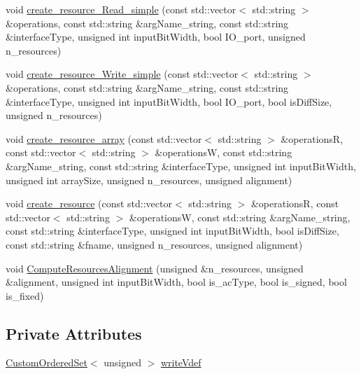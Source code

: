 \begin{DoxyCompactItemize}
\item 
void \hyperlink{classinterface__infer_a1b660bd8340d00695b5b8163edabe9f2}{create\+\_\+resource\+\_\+\+Read\+\_\+simple} (const std\+::vector$<$ std\+::string $>$ \&operations, const std\+::string \&arg\+Name\+\_\+string, const std\+::string \&interface\+Type, unsigned int input\+Bit\+Width, bool I\+O\+\_\+port, unsigned n\+\_\+resources)
\item 
void \hyperlink{classinterface__infer_a939d3b1a8c42718def0faaad4e09624f}{create\+\_\+resource\+\_\+\+Write\+\_\+simple} (const std\+::vector$<$ std\+::string $>$ \&operations, const std\+::string \&arg\+Name\+\_\+string, const std\+::string \&interface\+Type, unsigned int input\+Bit\+Width, bool I\+O\+\_\+port, bool is\+Diff\+Size, unsigned n\+\_\+resources)
\item 
void \hyperlink{classinterface__infer_a0bff55a66fa24a9b18c1aadd1c224f87}{create\+\_\+resource\+\_\+array} (const std\+::vector$<$ std\+::string $>$ \&operationsR, const std\+::vector$<$ std\+::string $>$ \&operationsW, const std\+::string \&arg\+Name\+\_\+string, const std\+::string \&interface\+Type, unsigned int input\+Bit\+Width, unsigned int array\+Size, unsigned n\+\_\+resources, unsigned alignment)
\item 
void \hyperlink{classinterface__infer_adaa76ea6635a0d64f796b9ff84da3d4b}{create\+\_\+resource} (const std\+::vector$<$ std\+::string $>$ \&operationsR, const std\+::vector$<$ std\+::string $>$ \&operationsW, const std\+::string \&arg\+Name\+\_\+string, const std\+::string \&interface\+Type, unsigned int input\+Bit\+Width, bool is\+Diff\+Size, const std\+::string \&fname, unsigned n\+\_\+resources, unsigned alignment)
\item 
void \hyperlink{classinterface__infer_ab4aeabadb7b03a53d0605a3cc88fe6df}{Compute\+Resources\+Alignment} (unsigned \&n\+\_\+resources, unsigned \&alignment, unsigned int input\+Bit\+Width, bool is\+\_\+ac\+Type, bool is\+\_\+signed, bool is\+\_\+fixed)
\end{DoxyCompactItemize}
\subsection*{Private Attributes}
\begin{DoxyCompactItemize}
\item 
\hyperlink{classCustomOrderedSet}{Custom\+Ordered\+Set}$<$ unsigned $>$ \hyperlink{classinterface__infer_a4b46febd5b45bd3d489232eb93873e66}{write\+Vdef}
\end{DoxyCompactItemize}

